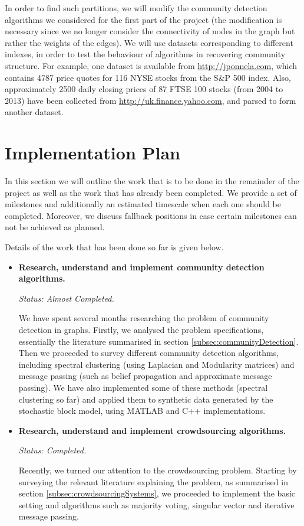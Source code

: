 \documentclass[12pt]{article}
\numberwithin{equation}{section}
\begin{document}
In order to find such partitions, we will modify the community detection algorithms we considered for the first part of the project (the modification is necessary since we no longer consider the connectivity of nodes in the graph but rather the weights of the edges). We will use datasets corresponding to different indexes, in order to test the behaviour of algorithms in recovering community structure. For example, one dataset is available from \url{http://jponnela.com}, which contains 4787 price quotes for 116 NYSE stocks from the S\&P 500 index. Also, approximately 2500 daily closing prices of 87 FTSE 100 stocks (from 2004 to 2013) have been collected from \url{http://uk.finance.yahoo.com}, and parsed to form another dataset.


\newpage
\thispagestyle{plain}
\mbox{}
\section {Implementation Plan}
\label{sec:implementationPlan}

In this section we will outline the work that is to be done in the remainder of the project as well as the work that has already been completed. We provide a set of milestones and additionally an estimated timescale when each one should be completed. Moreover, we discuss fallback positions in case certain milestones can not be achieved as planned.

Details of the work that has been done so far is given below.
\begin{itemize}
	\item \textbf{Research, understand and implement community detection algorithms.}

	\textit{Status: Almost Completed.}	

	We have spent several months researching the problem of community detection in graphs. Firstly, we analysed the problem specifications, essentially the literature summarised in section \ref{subsec:communityDetection}. Then we proceeded to survey different community detection algorithms, including spectral clustering (using Laplacian and Modularity matrices) and message passing (such as belief propagation and approximate message passing). We have also implemented some of these methods (spectral clustering so far) and applied them to synthetic data generated by the stochastic block model, using MATLAB and C++ implementations.

	\item \textbf{Research, understand and implement crowdsourcing algorithms.}

	\textit{Status: Completed.}

	Recently, we turned our attention to the crowdsourcing problem. Starting by surveying the relevant literature explaining the problem, as summarised in section \ref{subsec:crowdsourcingSystems}, we proceeded to implement the basic setting and algorithms such as majority voting, singular vector and iterative message passing.
\end{itemize}
\end{document}
